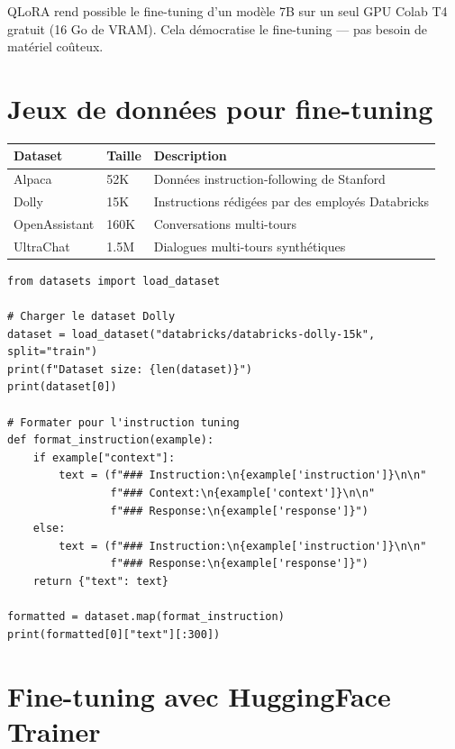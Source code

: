 \begin{aitip}
QLoRA rend possible le fine-tuning d'un mod\`ele 7B sur un seul GPU Colab T4 gratuit (16 Go de VRAM). Cela d\'emocratise le fine-tuning --- pas besoin de mat\'eriel co\^uteux.
\end{aitip}

\section{Jeux de donn\'ees pour fine-tuning}

\begin{longtable}{p{3cm}p{3cm}p{6.5cm}}
\toprule
\textbf{Dataset} & \textbf{Taille} & \textbf{Description} \\
\midrule
Alpaca & 52K & Donn\'ees instruction-following de Stanford \\
Dolly & 15K & Instructions r\'edig\'ees par des employ\'es Databricks \\
OpenAssistant & 160K & Conversations multi-tours \\
UltraChat & 1.5M & Dialogues multi-tours synth\'etiques \\
\bottomrule
\end{longtable}

\begin{verbatim}
from datasets import load_dataset

# Charger le dataset Dolly
dataset = load_dataset("databricks/databricks-dolly-15k", split="train")
print(f"Dataset size: {len(dataset)}")
print(dataset[0])

# Formater pour l'instruction tuning
def format_instruction(example):
    if example["context"]:
        text = (f"### Instruction:\n{example['instruction']}\n\n"
                f"### Context:\n{example['context']}\n\n"
                f"### Response:\n{example['response']}")
    else:
        text = (f"### Instruction:\n{example['instruction']}\n\n"
                f"### Response:\n{example['response']}")
    return {"text": text}

formatted = dataset.map(format_instruction)
print(formatted[0]["text"][:300])
\end{verbatim}

\section{Fine-tuning avec HuggingFace Trainer}

